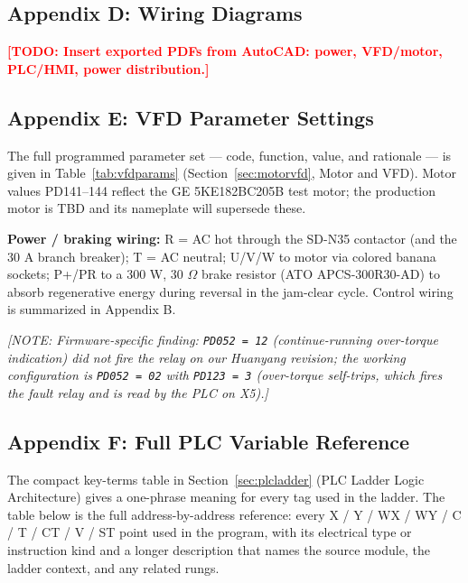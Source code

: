 \documentclass[hidelinks,12pt]{article}
\newcommand{\todo}[1]{\textcolor{red}{\textbf{[TODO: #1]}}}
\newcommand{\note}[1]{\textcolor{PSUblue}{\textit{[NOTE: #1]}}}
\begin{document}
\subsection{Appendix D: Wiring Diagrams}
\todo{Insert exported PDFs from AutoCAD: power, VFD/motor, PLC/HMI, power distribution.}

\subsection{Appendix E: VFD Parameter Settings}
The full programmed parameter set --- code, function, value, and rationale --- is given
in Table~\ref{tab:vfdparams} (Section~\ref{sec:motorvfd}, Motor and VFD). Motor values
PD141--144 reflect the GE 5KE182BC205B test motor; the production motor is TBD and its
nameplate will supersede these.

\textbf{Power / braking wiring:} R = AC hot through the SD-N35 contactor (and the
30 A branch breaker); T = AC neutral; U/V/W to motor via colored banana sockets; P+/PR to a 300 W, 30 $\Omega$
brake resistor (ATO APCS-300R30-AD) to absorb regenerative energy during reversal in
the jam-clear cycle. Control wiring is summarized in Appendix B.

\note{Firmware-specific finding: \texttt{PD052 = 12} (continue-running over-torque
indication) did not fire the relay on our Huanyang revision; the working configuration
is \texttt{PD052 = 02} with \texttt{PD123 = 3} (over-torque self-trips, which fires the
fault relay and is read by the PLC on X5).}

\subsection{Appendix F: Full PLC Variable Reference}
\label{sec:appendix_varmap}

The compact key-terms table in Section~\ref{sec:plcladder} (PLC Ladder Logic
Architecture) gives a one-phrase meaning for every tag used in the ladder. The
table below is the full address-by-address reference: every X / Y / WX / WY / C
/ T / CT / V / ST point used in the program, with its electrical type or
instruction kind and a longer description that names the source module, the
ladder context, and any related rungs.
\end{document}
